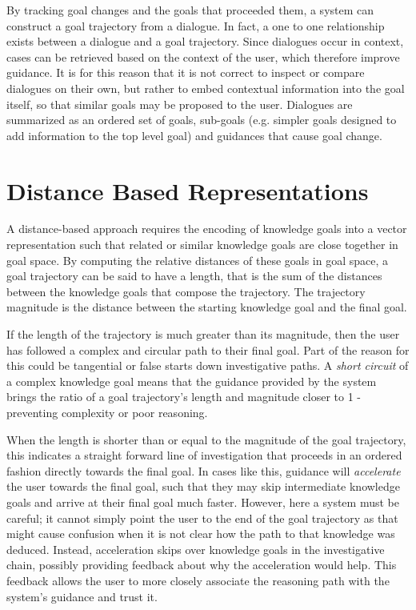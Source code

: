 \documentclass{llncs}
\begin{document}
By tracking goal changes and the goals that proceeded them, a system can construct a goal trajectory from a dialogue. In fact, a one to one relationship exists between a dialogue and a goal trajectory. Since dialogues occur in context, cases can be retrieved based on the context of the user, which therefore improve guidance. It is for this reason that it is not correct to inspect or compare dialogues on their own, but rather to embed contextual information into the goal itself, so that similar goals may be proposed to the user. Dialogues are summarized as an ordered set of goals, sub-goals (e.g. simpler goals designed to add information to the top level goal) and guidances that cause goal change.

\section{Distance Based Representations}

A distance-based approach requires the encoding of knowledge goals into a vector representation such that related or similar knowledge goals are close together in goal space. By computing the relative distances of these goals in goal space, a goal trajectory can be said to have a length, that is the sum of the distances between the knowledge goals that compose the trajectory. The trajectory magnitude is the distance between the starting knowledge goal and the final goal.

If the length of the trajectory is much greater than its magnitude, then the user has followed a complex and circular path to their final goal. Part of the reason for this could be tangential or false starts down investigative paths. A \textit{short circuit} of a complex knowledge goal means that the guidance provided by the system brings the ratio of a goal trajectory's length and magnitude closer to 1 - preventing complexity or poor reasoning.

When the length is shorter than or equal to the magnitude of the goal trajectory, this indicates a straight forward line of investigation that proceeds in an ordered fashion directly towards the final goal. In cases like this, guidance will \textit{accelerate} the user towards the final goal, such that they may skip intermediate knowledge goals and arrive at their final goal much faster. However, here a system must be careful; it cannot simply point the user to the end of the goal trajectory as that might cause confusion when it is not clear how the path to that knowledge was deduced. Instead, acceleration skips over knowledge goals in the investigative chain, possibly providing feedback about why the acceleration would help. This feedback allows the user to more closely associate the reasoning path with the system's guidance and trust it.
\end{document}
